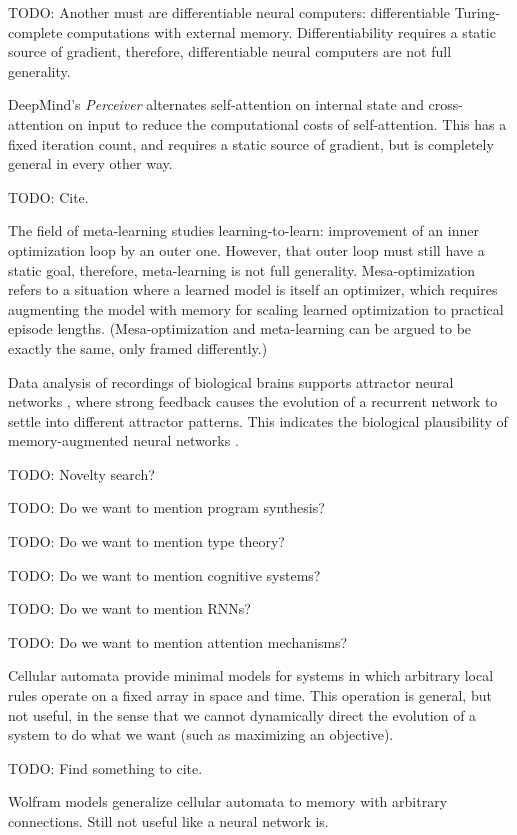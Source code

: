 \documentclass{article}
\begin{document}
    TODO: Another must are differentiable neural computers: differentiable Turing-complete computations with external memory. Differentiability requires a static source of gradient, therefore, differentiable neural computers are not full generality.

DeepMind's \textit{Perceiver} \cite{DBLP:journals/corr/abs-2103-03206} alternates self-attention on internal state and cross-attention on input to reduce the computational costs of self-attention. This has a fixed iteration count, and requires a static source of gradient, but is completely general in every other way.

    TODO: Cite.

The field of meta-learning studies learning-to-learn: improvement of an inner optimization loop by an outer one. However, that outer loop must still have a static goal, therefore, meta-learning is not full generality. Mesa-optimization \cite{hubinger2019risks} refers to a situation where a learned model is itself an optimizer, which requires augmenting the model with memory for scaling learned optimization to practical episode lengths. (Mesa-optimization and meta-learning can be argued to be exactly the same, only framed differently.)

Data analysis of recordings of biological brains supports attractor neural networks \cite{AMIT1990111}, where strong feedback causes the evolution of a recurrent network to settle into different attractor patterns. This indicates the biological plausibility of memory-augmented neural networks \cite{santoro2016oneshot}.

    TODO: Novelty search?

    TODO: Do we want to mention program synthesis?

    TODO: Do we want to mention type theory?

    TODO: Do we want to mention cognitive systems?

    TODO: Do we want to mention RNNs?

    TODO: Do we want to mention attention mechanisms?

Cellular automata provide minimal models for systems in which arbitrary local rules operate on a fixed array in space and time. This operation is general, but not useful, in the sense that we cannot dynamically direct the evolution of a system to do what we want (such as maximizing an objective).

    TODO: Find something to cite.

Wolfram models generalize cellular automata to memory with arbitrary connections. Still not useful like a neural network is.
\end{document}
